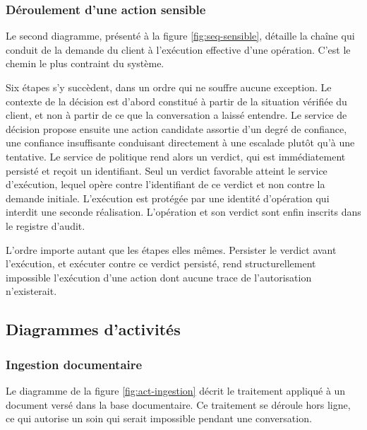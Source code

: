 \subsubsection{Déroulement d'une action sensible}

Le second diagramme, présenté à la figure \ref{fig:seq-sensible}, détaille la chaîne qui conduit de la demande du client à l'exécution effective d'une opération. C'est le chemin le plus contraint du système.

Six étapes s'y succèdent, dans un ordre qui ne souffre aucune exception. Le contexte de la décision est d'abord constitué à partir de la situation vérifiée du client, et non à partir de ce que la conversation a laissé entendre. Le service de décision propose ensuite une action candidate assortie d'un degré de confiance, une confiance insuffisante conduisant directement à une escalade plutôt qu'à une tentative. Le service de politique rend alors un verdict, qui est immédiatement persisté et reçoit un identifiant. Seul un verdict favorable atteint le service d'exécution, lequel opère contre l'identifiant de ce verdict et non contre la demande initiale. L'exécution est protégée par une identité d'opération qui interdit une seconde réalisation. L'opération et son verdict sont enfin inscrits dans le registre d'audit.

L'ordre importe autant que les étapes elles mêmes. Persister le verdict avant l'exécution, et exécuter contre ce verdict persisté, rend structurellement impossible l'exécution d'une action dont aucune trace de l'autorisation n'existerait.


\subsection{Diagrammes d'activités}

\subsubsection{Ingestion documentaire}

Le diagramme de la figure \ref{fig:act-ingestion} décrit le traitement appliqué à un document versé dans la base documentaire. Ce traitement se déroule hors ligne, ce qui autorise un soin qui serait impossible pendant une conversation.

